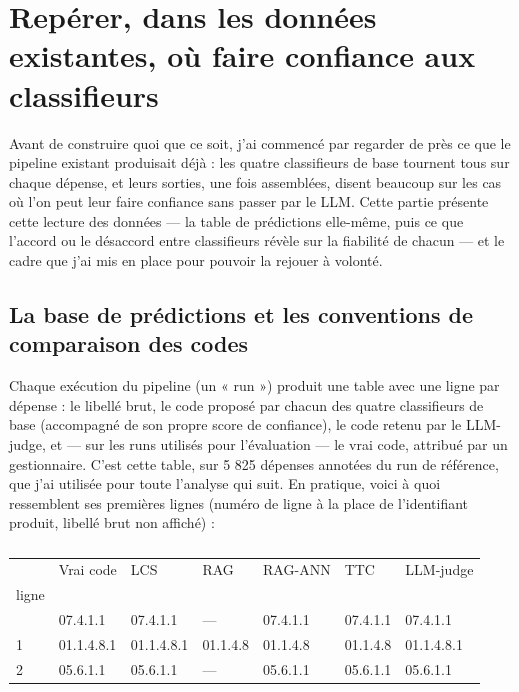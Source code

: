 \documentclass[
]{rapportCS}
\begin{document}
\newpage

\section{Repérer, dans les données existantes, où faire confiance aux
classifieurs}\label{repuxe9rer-dans-les-donnuxe9es-existantes-ouxf9-faire-confiance-aux-classifieurs}

Avant de construire quoi que ce soit, j'ai commencé par regarder de près
ce que le pipeline existant produisait déjà : les quatre classifieurs de
base tournent tous sur chaque dépense, et leurs sorties, une fois
assemblées, disent beaucoup sur les cas où l'on peut leur faire
confiance sans passer par le LLM. Cette partie présente cette lecture
des données --- la table de prédictions elle-même, puis ce que l'accord
ou le désaccord entre classifieurs révèle sur la fiabilité de chacun ---
et le cadre que j'ai mis en place pour pouvoir la rejouer à volonté.

\subsection{La base de prédictions et les conventions de comparaison des
codes}\label{la-base-de-pruxe9dictions-et-les-conventions-de-comparaison-des-codes}

Chaque exécution du pipeline (un « run ») produit une table avec une
ligne par dépense : le libellé brut, le code proposé par chacun des
quatre classifieurs de base (accompagné de son propre score de
confiance), le code retenu par le LLM-judge, et --- sur les runs
utilisés pour l'évaluation --- le vrai code, attribué par un
gestionnaire. C'est cette table, sur 5 825 dépenses annotées du run de
référence, que j'ai utilisée pour toute l'analyse qui suit. En pratique,
voici à quoi ressemblent ses premières lignes (numéro de ligne à la
place de l'identifiant produit, libellé brut non affiché) :

{

\begin{longtable}[]{@{}lllllll@{}}

\caption{\label{tbl-apercu-donnees}}

\tabularnewline

\toprule\noalign{}
& Vrai code & LCS & RAG & RAG-ANN & TTC & LLM-judge \\
ligne & & & & & & \\
\midrule\noalign{}
\endhead
\bottomrule\noalign{}
\endlastfoot
0 & 07.4.1.1 & 07.4.1.1 & --- & 07.4.1.1 & 07.4.1.1 & 07.4.1.1 \\
1 & 01.1.4.8.1 & 01.1.4.8.1 & 01.1.4.8 & 01.1.4.8 & 01.1.4.8 &
01.1.4.8.1 \\
2 & 05.6.1.1 & 05.6.1.1 & --- & 05.6.1.1 & 05.6.1.1 & 05.6.1.1 \\

\end{longtable}

}
\end{document}
